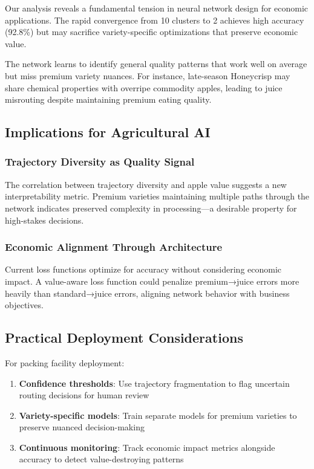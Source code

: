 \documentclass[11pt,a4paper]{article}
\begin{document}
Our analysis reveals a fundamental tension in neural network design for economic applications. The rapid convergence from 10 clusters to 2 achieves high accuracy (92.8\%) but may sacrifice variety-specific optimizations that preserve economic value. 

The network learns to identify general quality patterns that work well on average but miss premium variety nuances. For instance, late-season Honeycrisp may share chemical properties with overripe commodity apples, leading to juice misrouting despite maintaining premium eating quality.

\subsection{Implications for Agricultural AI}

\subsubsection{Trajectory Diversity as Quality Signal}
The correlation between trajectory diversity and apple value suggests a new interpretability metric. Premium varieties maintaining multiple paths through the network indicates preserved complexity in processing—a desirable property for high-stakes decisions.

\subsubsection{Economic Alignment Through Architecture}
Current loss functions optimize for accuracy without considering economic impact. A value-aware loss function could penalize premium→juice errors more heavily than standard→juice errors, aligning network behavior with business objectives.

\subsection{Practical Deployment Considerations}

For packing facility deployment:
\begin{enumerate}
    \item \textbf{Confidence thresholds}: Use trajectory fragmentation to flag uncertain routing decisions for human review
    \item \textbf{Variety-specific models}: Train separate models for premium varieties to preserve nuanced decision-making
    \item \textbf{Continuous monitoring}: Track economic impact metrics alongside accuracy to detect value-destroying patterns
\end{enumerate}
\end{document}
